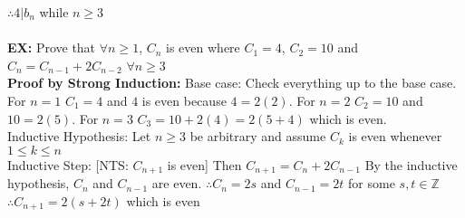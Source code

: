 \documentclass{article}
\begin{document}
		\boldmath $\therefore 4|b_n$ while $n\geq 3$\unboldmath\\
		\\
		\textbf{EX:} Prove that $\forall n\geq 1$, $C_n$ is even where $C_1=4$, $C_2=10$ and $C_n=C_{n-1}+2C_{n-2}$ $\forall n\geq 3$\\
		\textbf{Proof by Strong Induction:} Base case: Check everything up to the base case. For $n=1$ $C_1=4$ and $4$ is even because $4=2(2)$. For $n=2$ $C_2=10$ and $10=2(5)$. For $n=3$ $C_3=10+2(4)=2(5+4)$ which is even.\\
		Inductive Hypothesis: Let $n\geq 3$ be arbitrary and assume $C_k$ is even whenever $1\leq k \leq n$\\
		Inductive Step: [NTS: $C_{n+1}$ is even] Then $C_{n+1}=C_{n}+2C_{n-1}$ By the inductive hypothesis, $C_n$ and $C_{n-1}$ are even. $\therefore C_n = 2s$ and $C_{n-1} = 2t$ for some $s,t\in\mathbb{Z}$\\
		$\therefore C_{n+1} = 2(s+2t)$ which is even
				
\end{document}
